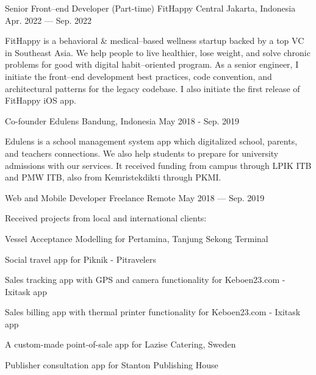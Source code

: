 \begin{cventries}
  \cventry
    {Senior Front--end Developer (Part-time)} %
    {FitHappy} %
    {Central Jakarta, Indonesia} %
    {Apr. 2022 --- Sep. 2022} %
    {
      \begin{cvitems} 
        FitHappy is a behavioral \& medical--based wellness startup backed by a top VC in Southeast Asia. 
        We help people to live healthier, lose weight, and solve chronic problems for good with digital habit--oriented program. 
        As a senior engineer, I initiate the front--end development best practices, code convention, and architectural patterns for the legacy codebase. 
        I also initiate the first release of FitHappy iOS app.
      \end{cvitems}
    }
    

  \cventry
    {Co-founder} %
    {Edulens} %
    {Bandung, Indonesia} %
    {May 2018 - Sep. 2019} %
    {
      \begin{cvitems} %
        Edulens is a school management system app which digitalized school, parents, and teachers connections. 
        We also help students to prepare for university admissions with our services. 
        It received funding from campus through LPIK ITB and PMW ITB, also from Kemristekdikti through PKMI.
      \end{cvitems}
    }

  \cventry
    {Web and Mobile Developer} %
    {Freelance} %
    {Remote} %
    {May 2018 --- Sep. 2019} %
    {
      \begin{cvitems} %
        \item {Received projects from local and international clients:}
        \item {Vessel Acceptance Modelling for Pertamina, Tanjung Sekong Terminal}
        \item {Social travel app for Piknik - Pitravelers}
        \item {Sales tracking app with GPS and camera functionality for Keboen23.com - Ixitask app}
        \item {Sales billing app with thermal printer functionality for Keboen23.com - Ixitask app}
        \item {A custom-made point-of-sale app for Lazise Catering, Sweden}
        \item {Publisher consultation app for Stanton Publishing House}
      \end{cvitems}
    }

\end{cventries}
